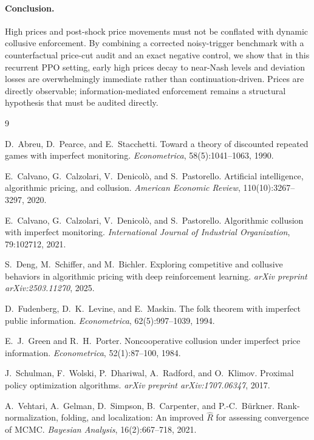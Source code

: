 \documentclass{article}
\begin{document}
\paragraph{Conclusion.}
High prices and post-shock price movements must not be conflated with dynamic collusive enforcement. By combining a corrected noisy-trigger benchmark with a counterfactual price-cut audit and an exact negative control, we show that in this recurrent PPO setting, early high prices decay to near-Nash levels and deviation losses are overwhelmingly immediate rather than continuation-driven. Prices are directly observable; information-mediated enforcement remains a structural hypothesis that must be audited directly.


\begin{thebibliography}{9}

D.~Abreu, D.~Pearce, and E.~Stacchetti.
\newblock Toward a theory of discounted repeated games with imperfect
  monitoring.
\newblock \emph{Econometrica}, 58(5):1041--1063, 1990.

E.~Calvano, G.~Calzolari, V.~Denicol\`o, and S.~Pastorello.
\newblock Artificial intelligence, algorithmic pricing, and collusion.
\newblock \emph{American Economic Review}, 110(10):3267--3297, 2020.

E.~Calvano, G.~Calzolari, V.~Denicol\`o, and S.~Pastorello.
\newblock Algorithmic collusion with imperfect monitoring.
\newblock \emph{International Journal of Industrial Organization}, 79:102712,
  2021.

S.~Deng, M.~Schiffer, and M.~Bichler.
\newblock Exploring competitive and collusive behaviors in algorithmic
  pricing with deep reinforcement learning.
\newblock \emph{arXiv preprint arXiv:2503.11270}, 2025.

D.~Fudenberg, D.~K.~Levine, and E.~Maskin.
\newblock The folk theorem with imperfect public information.
\newblock \emph{Econometrica}, 62(5):997--1039, 1994.

E.~J.~Green and R.~H.~Porter.
\newblock Noncooperative collusion under imperfect price information.
\newblock \emph{Econometrica}, 52(1):87--100, 1984.

J.~Schulman, F.~Wolski, P.~Dhariwal, A.~Radford, and O.~Klimov.
\newblock Proximal policy optimization algorithms.
\newblock \emph{arXiv preprint arXiv:1707.06347}, 2017.

A.~Vehtari, A.~Gelman, D.~Simpson, B.~Carpenter, and P.-C.~B\"urkner.
\newblock Rank-normalization, folding, and localization: An improved
  $\hat{R}$ for assessing convergence of {MCMC}.
\newblock \emph{Bayesian Analysis}, 16(2):667--718, 2021.

\end{thebibliography}
\end{document}
